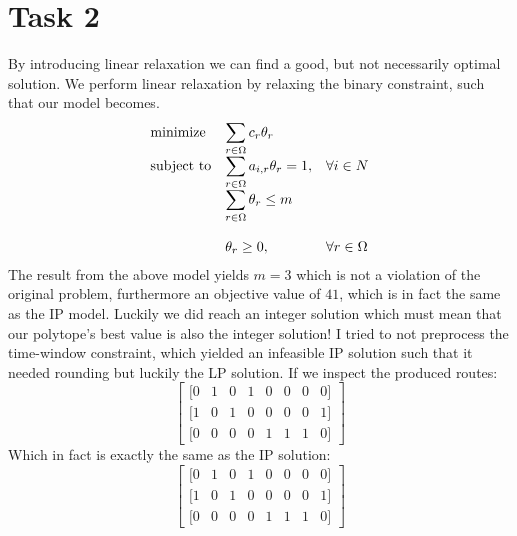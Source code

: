 \documentclass{article}
\begin{document}
    \clearpage
    \section*{Task 2}
    By introducing linear relaxation we can find a good, but not necessarily optimal solution.
    We perform linear relaxation by relaxing the binary constraint, such that our model becomes.
    \begin{equation*}
        \begin{array}{ll@{}ll}
            \text{minimize}  & \displaystyle\sum_{r \in \Omega} c_r \theta_r& &\\
            \text{subject to}& \displaystyle\sum_{r \in \Omega} a_{i, r} \theta_r = 1 ,&   &\forall i \in N\\
            & \displaystyle\sum_{r \in \Omega} \theta_r \leq m &&\\\\
            & \displaystyle \theta_r  \geq 0,  && \forall r \in \Omega
        \end{array}
    \end{equation*}
    The result from the above model yields $m = 3$ which is not a violation of the original problem, furthermore an objective value of $41$, which is in fact the same as the IP model.
    Luckily we did reach an integer solution which must mean that our polytope's best value is also the integer solution!
    I tried to not preprocess the time-window constraint, which yielded an infeasible IP solution such that it needed rounding but luckily the LP solution.
    If we inspect the produced routes:
    \[
    \begin{bmatrix}
        [0 & 1 & 0 & 1 & 0 & 0 & 0 & 0]\\
        [1 & 0 & 1 & 0 & 0 & 0 & 0 & 1]\\
        [0 & 0 & 0 & 0 & 1 & 1 & 1 & 0]
    \end{bmatrix}
    \]
    Which in fact is exactly the same as the IP solution:
    \[
        \begin{bmatrix}
            [0 & 1 & 0 & 1 & 0 & 0 & 0 & 0]\\
            [1 & 0 & 1 & 0 & 0 & 0 & 0 & 1]\\
            [0 & 0 & 0 & 0 & 1 & 1 & 1 & 0]
        \end{bmatrix}
    \]
\end{document}
